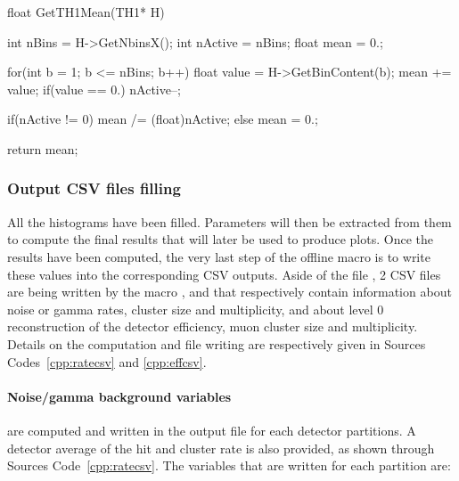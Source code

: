 	\begin{code}
	\begin{cppcode}
float GetTH1Mean(TH1* H){
    int nBins = H->GetNbinsX();
    int nActive = nBins;
    float mean = 0.;

    for(int b = 1; b <= nBins; b++){
        float value = H->GetBinContent(b);
        mean += value;
        if(value == 0.) nActive--;
    }

    if(nActive != 0) mean /= (float)nActive;
    else mean = 0.;

    return mean;
}
	\end{cppcode}
	\label{cpp:th1mean}
	\vspace{5mm}
	\end{code}
	
		\subsubsection{Output CSV files filling}
		\label{app2:sssec:CSVoutput}
		
	All the histograms have been filled. Parameters will then be extracted from them to compute the final results that will later be used to produce plots. Once the results have been computed, the very last step of the offline macro is to write these values into the corresponding CSV outputs. Aside of the file , 2 CSV files are being written by the macro ,  and  that respectively contain information about noise or gamma rates, cluster size and multiplicity, and about level 0 reconstruction of the detector efficiency, muon cluster size and multiplicity. Details on the computation and file writing are respectively given in Sources Codes~\ref{cpp:ratecsv} and \ref{cpp:effcsv}.
	
	\paragraph{Noise/gamma background variables} are computed and written in the output file for each detector partitions. A detector average of the hit and cluster rate is also provided, as shown through Sources Code~\ref{cpp:ratecsv}. The variables that are written for each partition are:
	
